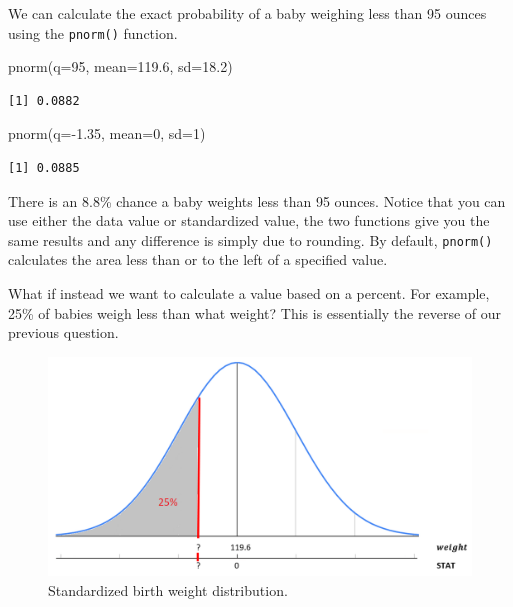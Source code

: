 \documentclass[
  letterpaper,
  DIV=11,
  numbers=noendperiod]{scrreprt}
\newenvironment{Shaded}{\begin{snugshade}}{\end{snugshade}}
\newcommand{\AttributeTok}[1]{\textcolor[rgb]{0.40,0.45,0.13}{#1}}
\newcommand{\DecValTok}[1]{\textcolor[rgb]{0.68,0.00,0.00}{#1}}
\newcommand{\FloatTok}[1]{\textcolor[rgb]{0.68,0.00,0.00}{#1}}
\newcommand{\FunctionTok}[1]{\textcolor[rgb]{0.28,0.35,0.67}{#1}}
\newcommand{\NormalTok}[1]{\textcolor[rgb]{0.00,0.23,0.31}{#1}}
\newcommand{\SpecialCharTok}[1]{\textcolor[rgb]{0.37,0.37,0.37}{#1}}
\theoremstyle{definition}
\theoremstyle{remark}
\begin{document}
We can calculate the exact probability of a baby weighing less than 95
ounces using the \texttt{pnorm()} function.

\begin{Shaded}
\begin{Highlighting}[]
\FunctionTok{pnorm}\NormalTok{(}\AttributeTok{q=}\DecValTok{95}\NormalTok{, }\AttributeTok{mean=}\FloatTok{119.6}\NormalTok{, }\AttributeTok{sd=}\FloatTok{18.2}\NormalTok{)}
\end{Highlighting}
\end{Shaded}

\begin{verbatim}
[1] 0.0882
\end{verbatim}

\begin{Shaded}
\begin{Highlighting}[]
\FunctionTok{pnorm}\NormalTok{(}\AttributeTok{q=}\SpecialCharTok{{-}}\FloatTok{1.35}\NormalTok{, }\AttributeTok{mean=}\DecValTok{0}\NormalTok{, }\AttributeTok{sd=}\DecValTok{1}\NormalTok{)}
\end{Highlighting}
\end{Shaded}

\begin{verbatim}
[1] 0.0885
\end{verbatim}

There is an 8.8\% chance a baby weights less than 95 ounces. Notice that
you can use either the data value or standardized value, the two
functions give you the same results and any difference is simply due to
rounding. By default, \texttt{pnorm()} calculates the area less than or
to the left of a specified value.

What if instead we want to calculate a value based on a percent. For
example, 25\% of babies weigh less than what weight? This is essentially
the reverse of our previous question.

\begin{figure}

{\centering \includegraphics{images/standardization4.png}

}

\caption{\label{fig-standardization4}Standardized birth weight
distribution.}

\end{figure}
\end{document}
